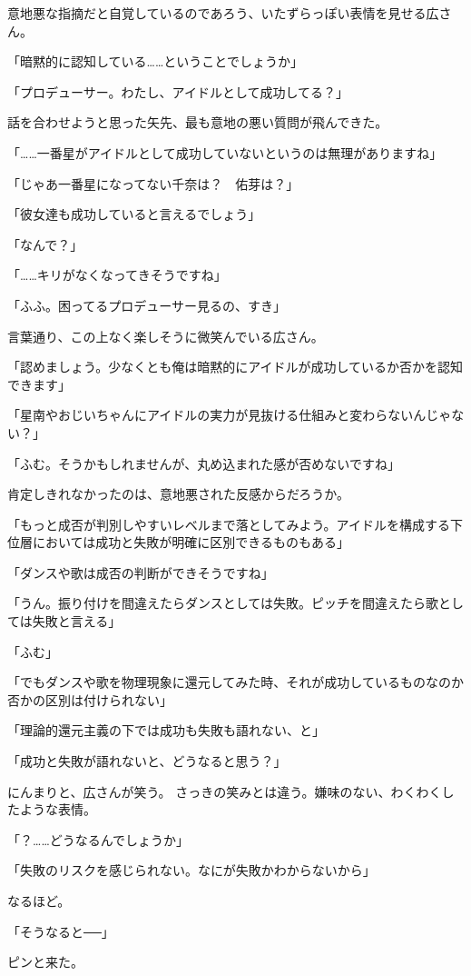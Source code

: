 \documentclass[paper=b5j]{jlreq}
\begin{document}
意地悪な指摘だと自覚しているのであろう、いたずらっぽい表情を見せる広さん。

「暗黙的に認知している……ということでしょうか」

「プロデューサー。わたし、アイドルとして成功してる？」


話を合わせようと思った矢先、最も意地の悪い質問が飛んできた。

「……一番星がアイドルとして成功していないというのは無理がありますね」

「じゃあ一番星になってない千奈は？　佑芽は？」

「彼女達も成功していると言えるでしょう」

「なんで？」

「……キリがなくなってきそうですね」

「ふふ。困ってるプロデューサー見るの、すき」


言葉通り、この上なく楽しそうに微笑んでいる広さん。

「認めましょう。少なくとも俺は暗黙的にアイドルが成功しているか否かを認知できます」

「星南やおじいちゃんにアイドルの実力が見抜ける仕組みと変わらないんじゃない？」

「ふむ。そうかもしれませんが、丸め込まれた感が否めないですね」


肯定しきれなかったのは、意地悪された反感からだろうか。

「もっと成否が判別しやすいレベルまで落としてみよう。アイドルを構成する下位層においては成功と失敗が明確に区別できるものもある」

「ダンスや歌は成否の判断ができそうですね」

「うん。振り付けを間違えたらダンスとしては失敗。ピッチを間違えたら歌としては失敗と言える」

「ふむ」

「でもダンスや歌を物理現象に還元してみた時、それが成功しているものなのか否かの区別は付けられない」

「理論的還元主義の下では成功も失敗も語れない、と」

「成功と失敗が語れないと、どうなると思う？」


にんまりと、広さんが笑う。
さっきの笑みとは違う。嫌味のない、わくわくしたような表情。

「？……どうなるんでしょうか」

「失敗のリスクを感じられない。なにが失敗かわからないから」


なるほど。

「そうなると──」


ピンと来た。
\end{document}

